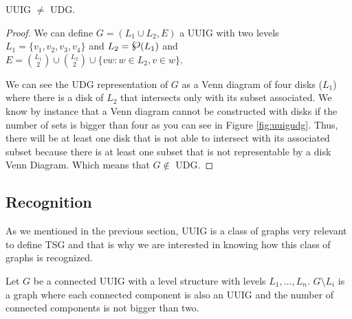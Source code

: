 \begin{theorem}
  UUIG $\neq$ UDG.
\end{theorem}

\begin{proof}
  We can define $G = (L_1\cup L_2, E)$ a UUIG with two levels $L_1=\{v_1, v_2, v_3, v_4\}$ and $L_2=\powerset(L_1)$ and $E = \binom{L_1}{2} \cup \binom{L_2}{2} \cup \{vw: w\in L_2, v\in w\}$.

  We can see the UDG representation of $G$ as a Venn diagram of four disks ($L_1$) where there is a disk of $L_2$ that intersects only with its subset associated. We know by instance that a Venn diagram cannot be constructed with disks if the number of sets is bigger than four \cite{vennDiagrammaticMechanicalRepresentation1880} as you can see in Figure \ref{fig:uuigudg}. Thus, there will be at least one disk that is not able to intersect with its associated subset because there is at least one subset that is not representable by a disk Venn Diagram. Which means that $G \notin$ UDG.
\end{proof}


\subsection{Recognition}

As we mentioned in the previous section, UUIG is a class of graphs very relevant to define TSG and that is why we are interested in knowing how this class of graphs is recognized.

\begin{lemma}
  Let $G$ be a connected UUIG with a level structure with levels $L_1,\dots,L_n$. $G\setminus L_i$ is a graph where each connected component is also an UUIG and the number of connected components is not bigger than two.
\end{lemma}

\\


